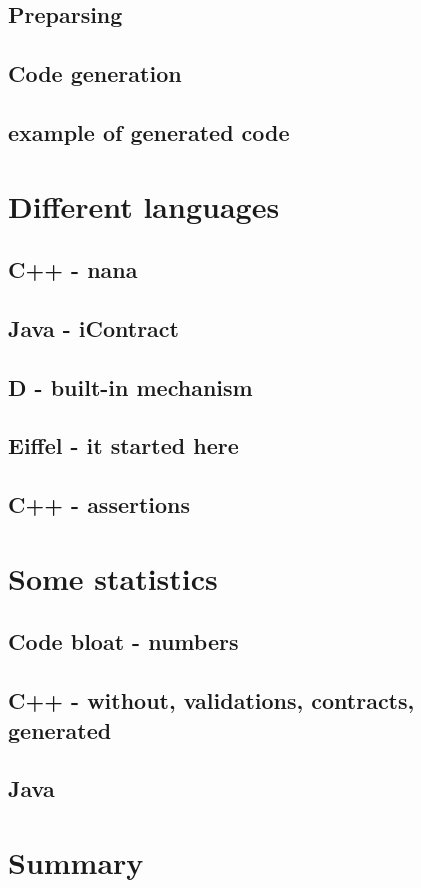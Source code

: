 \documentclass{beamer}
\begin{document}
\subsection{Preparsing}
\subsection{Code generation}
\subsection{example of generated code}
\section{Different languages}
\subsection{C++ - nana}
\subsection{Java - iContract}
\subsection{D - built-in mechanism}
\subsection{Eiffel - it started here}
\subsection{C++ - assertions}
\section{Some statistics}
\subsection{Code bloat - numbers}
\subsection{C++ - without, validations, contracts, generated}
\subsection{Java}

\section{Summary}
\end{document}
